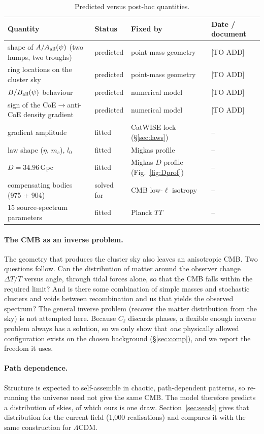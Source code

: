 \documentclass[11pt]{article}
\newcommand{\todo}[1]{\textsf{[#1]}}
\begin{document}
\begin{table}[!htb]\centering\small\caption{Predicted versus post-hoc quantities.}\label{tab:pred}
\begin{tabular}{@{}p{4.6cm}p{2.0cm}p{4.2cm}p{3.6cm}@{}}\toprule
Quantity & Status & Fixed by & Date / document\\\midrule
shape of $A/A_{\rm all}(\psi)$ (two humps, two troughs) & predicted & point-mass geometry & \todo{TO ADD}\\
ring locations on the cluster sky & predicted & point-mass geometry & \todo{TO ADD}\\
$B/B_{\rm all}(\psi)$ behaviour & predicted & numerical model & \todo{TO ADD}\\
sign of the CoE$\to$anti-CoE density gradient & predicted & numerical model & \todo{TO ADD}\\\midrule
gradient amplitude & fitted & CatWISE lock (\S\ref{sec:laws}) & --\\
law shape ($\eta$, $m_c$), $l_0$ & fitted & Migkas profile & --\\
$D=34.96$\,Gpc & fitted & Migkas $D$ profile (Fig.~\ref{fig:Dprof}) & --\\
compensating bodies (975 + 904) & solved for & CMB low-$\ell$ isotropy & --\\
15 source-spectrum parameters & fitted & Planck $TT$ & --\\\bottomrule
\end{tabular}\end{table}

\paragraph{The CMB as an inverse problem.} The geometry that produces the cluster sky also leaves an anisotropic CMB. Two questions follow. Can the distribution of matter around the observer change $\Delta T/T$ versus angle, through tidal forces alone, so that the CMB falls within the required limit? And is there some combination of simple masses and stochastic clusters and voids between recombination and us that yields the observed spectrum? The general inverse problem (recover the matter distribution from the sky) is not attempted here. Because $C_\ell$ discards phases, a flexible enough inverse problem always has a solution, so we only show that \emph{one} physically allowed configuration exists on the chosen background (\S\ref{sec:comp}), and we report the freedom it uses.

\paragraph{Path dependence.} Structure is expected to self-assemble in chaotic, path-dependent patterns, so re-running the universe need not give the same CMB. The model therefore predicts a distribution of skies, of which ours is one draw. Section~\ref{sec:seeds} gives that distribution for the current field (1,000 realisations) and compares it with the same construction for $\Lambda$CDM.
\end{document}

